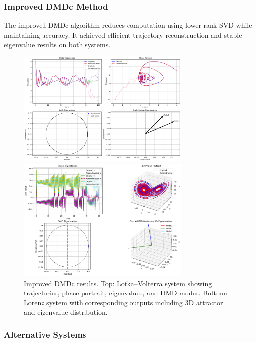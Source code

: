 \documentclass[a4paper,12pt]{report}
\theoremstyle{definition}
\numberwithin{equation}{section}
\begin{document}
\subsubsection*{Improved DMDc Method}

The improved DMDc algorithm reduces computation using lower-rank SVD while maintaining accuracy. It achieved efficient trajectory reconstruction and stable eigenvalue results on both systems\cite{proctor2018}.
\begin{figure}[h!]
    \centering
    \includegraphics[width=0.75\textwidth]{IPROVED LV.png}
    
    \vspace{1em}
    
    \includegraphics[width=0.75\textwidth]{IMPROVED LORENZ.png}
    
    \caption{Improved DMDc results. Top: Lotka–Volterra system showing trajectories, phase portrait, eigenvalues, and DMD modes. Bottom: Lorenz system with corresponding outputs including 3D attractor and eigenvalue distribution.}
\end{figure}



\newpage
\subsubsection*{Alternative Systems}
\end{document}
